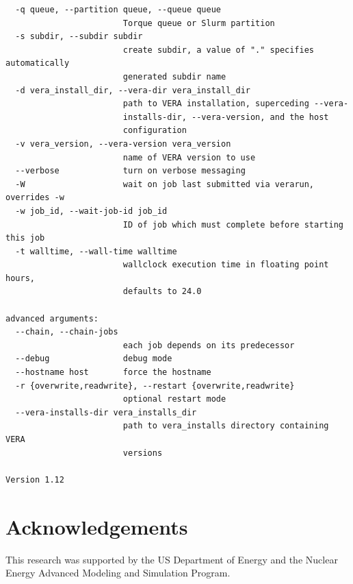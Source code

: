 \documentclass{vera-ornltm}
\begin{document}
\begin{verbatim}
  -q queue, --partition queue, --queue queue
                        Torque queue or Slurm partition
  -s subdir, --subdir subdir
                        create subdir, a value of "." specifies automatically
                        generated subdir name
  -d vera_install_dir, --vera-dir vera_install_dir
                        path to VERA installation, superceding --vera-
                        installs-dir, --vera-version, and the host
                        configuration
  -v vera_version, --vera-version vera_version
                        name of VERA version to use
  --verbose             turn on verbose messaging
  -W                    wait on job last submitted via verarun, overrides -w
  -w job_id, --wait-job-id job_id
                        ID of job which must complete before starting this job
  -t walltime, --wall-time walltime
                        wallclock execution time in floating point hours,
                        defaults to 24.0

advanced arguments:
  --chain, --chain-jobs
                        each job depends on its predecessor
  --debug               debug mode
  --hostname host       force the hostname
  -r {overwrite,readwrite}, --restart {overwrite,readwrite}
                        optional restart mode
  --vera-installs-dir vera_installs_dir
                        path to vera_installs directory containing VERA
                        versions

Version 1.12
\end{verbatim}

\section{Acknowledgements}

This research was supported by the US Department of Energy and the Nuclear Energy Advanced Modeling and Simulation Program.

\end{document}
